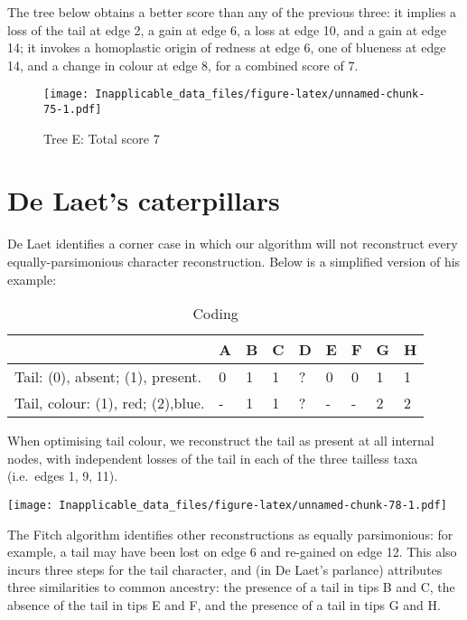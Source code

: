\documentclass[]{book}
\theoremstyle{definition}
\theoremstyle{definition}
\theoremstyle{definition}
\theoremstyle{remark}
\begin{document}
The tree below obtains a better score than any of the previous three: it
implies a loss of the tail at edge 2, a gain at edge 6, a loss at edge
10, and a gain at edge 14; it invokes a homoplastic origin of redness at
edge 6, one of blueness at edge 14, and a change in colour at edge 8,
for a combined score of 7.

\begin{figure}
\centering
\texttt{[image: Inapplicable\_data\_files/figure-latex/unnamed-chunk-75-1.pdf]}
\caption{\label{fig:unnamed-chunk-75}Tree E: Total score 7}
\end{figure}

\hypertarget{de-laets-caterpillars}{%
\section{De Laet's caterpillars}\label{de-laets-caterpillars}}

De Laet \citeyearpar{DeLaet2017} identifies a corner case in which our
algorithm \citep{ThisStudy} will not reconstruct every
equally-parsimonious character reconstruction. Below is a simplified
version of his example:

\begin{table}

\caption{\label{tab:unnamed-chunk-77}Coding}
\centering
\begin{tabular}[t]{l|l|l|l|l|l|l|l|l}
\hline
  & A & B & C & D & E & F & G & H\\
\hline
Tail: (0), absent; (1), present. & 0 & 1 & 1 & ? & 0 & 0 & 1 & 1\\
\hline
Tail, colour: (1), red; (2),blue. & - & 1 & 1 & ? & - & - & 2 & 2\\
\hline
\end{tabular}
\end{table}

When optimising tail colour, we reconstruct the tail as present at all
internal nodes, with independent losses of the tail in each of the three
tailless taxa (i.e.~edges 1, 9, 11).

\texttt{[image: Inapplicable\_data\_files/figure-latex/unnamed-chunk-78-1.pdf]}

The Fitch algorithm identifies other reconstructions as equally
parsimonious: for example, a tail may have been lost on edge 6 and
re-gained on edge 12. This also incurs three steps for the tail
character, and (in De Laet's parlance) attributes three similarities to
common ancestry: the presence of a tail in tips B and C, the absence of
the tail in tips E and F, and the presence of a tail in tips G and H.
\end{document}

